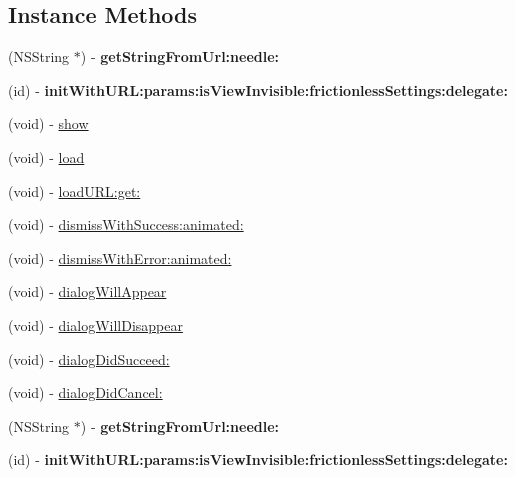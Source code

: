\subsection*{Instance Methods}
\begin{DoxyCompactItemize}
\item 
\mbox{\label{interfaceFBDialog_a260b90e3c40a16971f96e1b034580b6c}} 
(N\+S\+String $\ast$) -\/ {\bfseries get\+String\+From\+Url\+:needle\+:}
\item 
\mbox{\label{interfaceFBDialog_a32c8d318742c1316f0717dbda6938412}} 
(id) -\/ {\bfseries init\+With\+U\+R\+L\+:params\+:is\+View\+Invisible\+:frictionless\+Settings\+:delegate\+:}
\item 
(void) -\/ \hyperlink{interfaceFBDialog_a657a94d26c8dd3dfbe60b64c6bcbf411}{show}
\item 
(void) -\/ \hyperlink{interfaceFBDialog_a41ca6458674d1701e6e1d143d5aeb972}{load}
\item 
(void) -\/ \hyperlink{interfaceFBDialog_a48ed8ccf4d0c21239524cbfb0ef1c2bf}{load\+U\+R\+L\+:get\+:}
\item 
(void) -\/ \hyperlink{interfaceFBDialog_a5250f7dbf293b91efbc498cd980ea629}{dismiss\+With\+Success\+:animated\+:}
\item 
(void) -\/ \hyperlink{interfaceFBDialog_a88519295b89d9f78791bf316a34af3e1}{dismiss\+With\+Error\+:animated\+:}
\item 
(void) -\/ \hyperlink{interfaceFBDialog_ad0bfcbe959e7334d076079ce3288142d}{dialog\+Will\+Appear}
\item 
(void) -\/ \hyperlink{interfaceFBDialog_a0aaf0151353b93b543525601f9d41a83}{dialog\+Will\+Disappear}
\item 
(void) -\/ \hyperlink{interfaceFBDialog_a038587c0962d2dbda704f151d45eb6d3}{dialog\+Did\+Succeed\+:}
\item 
(void) -\/ \hyperlink{interfaceFBDialog_a91e729bd79578cb130cf5256e1fb2b8e}{dialog\+Did\+Cancel\+:}
\item 
\mbox{\label{interfaceFBDialog_a260b90e3c40a16971f96e1b034580b6c}} 
(N\+S\+String $\ast$) -\/ {\bfseries get\+String\+From\+Url\+:needle\+:}
\item 
\mbox{\label{interfaceFBDialog_a32c8d318742c1316f0717dbda6938412}} 
(id) -\/ {\bfseries init\+With\+U\+R\+L\+:params\+:is\+View\+Invisible\+:frictionless\+Settings\+:delegate\+:}

\end{DoxyCompactItemize}
